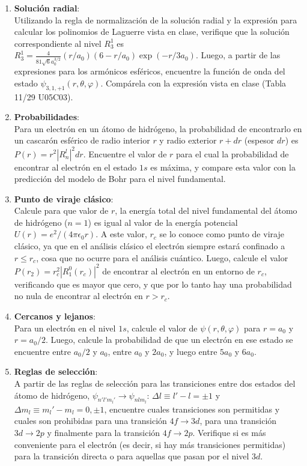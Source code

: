 \documentclass[a4paper,12pt]{article}
\begin{document}
\begin{enumerate}
	\item {\bf{Solución radial}}:\\
		Utilizando la regla de normalización de la solución radial y la
		expresión para calcular los polinomios de Laguerre vista en clase,
		verifique que la solución correspondiente al nivel $R_3^1$ es $R_3
		^1=\frac{4}{81 \sqrt{6} a_0^{3/2}} (r/a_0) (6 - r/a_0) \exp(-r/3 a_0)$.
		Luego, a partir de las expresiones para los armónicos esféricos,
		encuentre la función de onda del estado
		$\psi_{3,1,+1}(r,\theta,\varphi)$. Compárela con la expresión vista en
		clase (Tabla 11/29 U05C03).

	\item {\bf{Probabilidades}}:\\
		Para un electrón en un átomo de hidrógeno, la probabilidad de
		encontrarlo en un cascarón esférico de radio interior $r$ y radio
		exterior $r+dr$ (espesor $dr$) es $P(r)=r^2 |R_n^l|^2 dr$. Encuentre el
		valor de $r$ para el cual la probabilidad de encontrar al electrón en
		el estado $1s$ es máxima, y compare esta valor con la predicción del
		modelo de Bohr para el nivel fundamental.

	\item {\bf{Punto de viraje clásico}}:\\
		Calcule para que valor de $r$, la energía total del nivel fundamental
		del átomo de hidrógeno ($n=1$) es igual al valor de la energía
		potencial $U(r) = e^2/(4 \pi \epsilon_0 r)$. A este valor, $r_c$ se lo
		conoce como punto de viraje clásico, ya que en el análisis clásico el
		electrón siempre estará confinado a $r\leq r_c$, cosa que no ocurre
		para el análisis cuántico. Luego, calcule el valor $P(r_2)=r_c^2
		|R_1^0(r_c)|^2$ de encontrar al electrón en un entorno de $r_c$,
		verificando que es mayor que cero, y que por lo tanto hay una
		probabilidad no nula de encontrar al electrón en $r>r_c$.
	
	\item {\bf{Cercanos y lejanos}}:\\
		Para un electrón en el nivel $1s$, calcule el valor de
		$\psi(r,\theta,\varphi)$ para $r=a_0$ y $r=a_0/2$. Luego, calcule la
		probabilidad de que un electrón en ese estado se encuentre entre
		$a_0/2$ y $a_0$, entre $a_0$ y $2 a_0$, y luego entre $5 a_0$ y $6
		a_0$.

	\item {\bf{Reglas de selección}}:\\
		A partir de las reglas de selección para las transiciones entre dos
		estados del átomo de hidrógeno, $\psi_{n' l' m_l'} \to \psi_{n l m_l}$:
		$\Delta l \equiv l'-l = \pm 1$ y $\Delta m_l \equiv m_l' - m_l = 0, \pm
		1$, encuentre cuales transiciones son permitidas y cuales son
		prohibidas para una transición $4f \to 3d$, para una transición $3d
		\to 2p$ y finalmente para la transición $4f \to 2p$. Verifique si es
		más conveniente para el electrón (es decir, si hay más transiciones
		permitidas) para la transición directa o para aquellas que pasan por el
		nivel $3d$. 
\end{enumerate}
\end{document}

